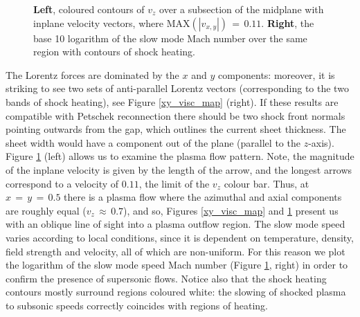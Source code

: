 \documentclass{./packages/rs/rsproca}
\begin{document}
\begin{figure}[h!]
  \caption{\small{\textbf{Left}, coloured contours of $v_{z}$ over a subsection of the midplane with inplane velocity vectors, where $\mathrm{MAX}(|v_{x,y}|)\,{=}\,0.11$. \textbf{Right}, the base 10 logarithm of the slow mode Mach number over the same region with contours of shock heating.}}
  \label{v_and_slow_mach}
  \vspace{-10pt}
\end{figure}

The Lorentz forces are dominated by the $x$ and $y$ components: moreover, it is striking to see two sets of anti-parallel Lorentz vectors (corresponding to the two bands of shock heating), see Figure \ref{xy_visc_map} (right). If these results are compatible with Petschek reconnection there should be two shock front normals pointing outwards from the gap, which outlines the current sheet thickness. The sheet width would have a component out of the plane (parallel to the $z$-axis). Figure \ref{v_and_slow_mach} (left) allows us to examine the plasma flow pattern. Note, the magnitude of the inplane velocity is given by the length of the arrow, and the longest arrows correspond to a velocity of $0.11$, the limit of the $v_z$ colour bar. Thus, at $x\,{=}\,y\,{=}\,0.5$ there is a plasma flow where the azimuthal and axial components are roughly equal ($v_z\,{\approx}\,0.7$), and so, Figures \ref{xy_visc_map} and \ref{v_and_slow_mach} present us with an oblique line of sight into a plasma outflow region. The slow mode speed varies according to local conditions, since it is dependent on temperature, density, field strength and velocity, all of which are non-uniform.
For this reason we plot the logarithm of the slow mode speed Mach number (Figure \ref{v_and_slow_mach}, right) in order to confirm the presence of supersonic flows. Notice also that the shock heating contours mostly surround regions coloured white: the slowing of shocked plasma to subsonic speeds correctly coincides with regions of heating.
\end{document}
